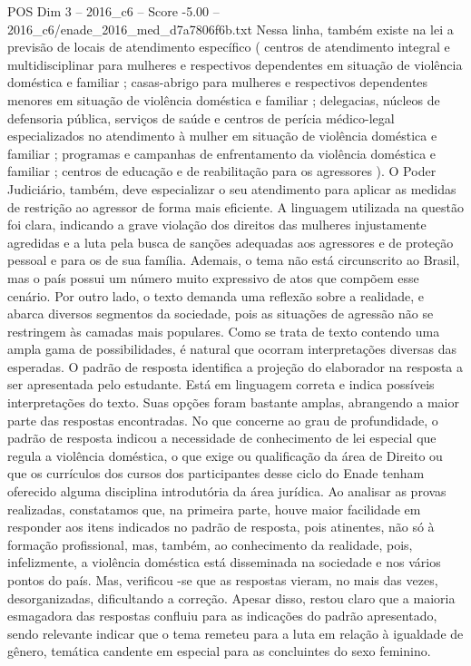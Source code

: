 \begin{textsample}{POS Dim 3 – 2016\_c6 – Score -5.00 – 2016\_c6/enade\_2016\_med\_d7a7806f6b.txt}
Nessa linha, também existe na lei a previsão de locais de atendimento específico ( centros de atendimento integral e multidisciplinar para mulheres e respectivos dependentes em situação de violência doméstica e familiar ; casas-abrigo para mulheres e respectivos dependentes menores em situação de violência doméstica e familiar ; delegacias, núcleos de defensoria pública, serviços de saúde e centros de perícia médico-legal especializados no atendimento à mulher em situação de violência doméstica e familiar ; programas e campanhas de enfrentamento da violência doméstica e familiar ; centros de educação e de reabilitação para os agressores ).
O Poder Judiciário, também, deve especializar o seu atendimento para aplicar as medidas de restrição ao agressor de forma mais eficiente.
A linguagem utilizada na questão foi clara, indicando a grave violação dos direitos das mulheres injustamente agredidas e a luta pela busca de sanções adequadas aos agressores e de proteção pessoal e para os de sua família.
Ademais, o tema não está circunscrito ao Brasil, mas o país possui um número muito expressivo de atos que compõem esse cenário.
Por outro lado, o texto demanda uma reflexão sobre a realidade, e abarca diversos segmentos da sociedade, pois as situações de agressão não se restringem às camadas mais populares.
Como se trata de texto contendo uma ampla gama de possibilidades, é natural que ocorram interpretações diversas das esperadas.
O padrão de resposta identifica a projeção do elaborador na resposta a ser apresentada pelo estudante.
Está em linguagem correta e indica possíveis interpretações do texto.
Suas opções foram bastante amplas, abrangendo a maior parte das respostas encontradas.
No que concerne ao grau de profundidade, o padrão de resposta indicou a necessidade de conhecimento de lei especial que regula a violência doméstica, o que exige ou qualificação da área de Direito ou que os currículos dos cursos dos participantes desse ciclo do Enade tenham oferecido alguma disciplina introdutória da área jurídica.
Ao analisar as provas realizadas, constatamos que, na primeira parte, houve maior facilidade em responder aos itens indicados no padrão de resposta, pois atinentes, não só à formação profissional, mas, também, ao conhecimento da realidade, pois, infelizmente, a violência doméstica está disseminada na sociedade e nos vários pontos do país.
Mas, verificou -se que as respostas vieram, no mais das vezes, desorganizadas, dificultando a correção.
Apesar disso, restou claro que a maioria esmagadora das respostas confluiu para as indicações do padrão apresentado, sendo relevante indicar que o tema remeteu para a luta em relação à igualdade de gênero, temática candente em especial para as concluintes do sexo feminino.

\end{textsample}
